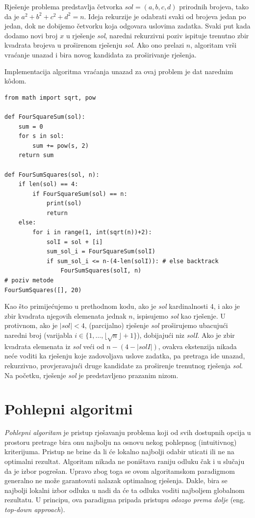 \begin{solution}
	Rješenje problema predstavlja četvorka $sol = (a, b, c, d)$ prirodnih brojeva, tako da je $a^2 + b^2 + c^2 + d^2 = n$. Ideja rekurzije je odabrati svaki  od brojeva jedan po jedan, dok ne dobijemo četvorku koja odgovara uslovima zadatka. Svaki put kada dodamo novi broj $x$ u rješenje \emph{sol}, naredni rekurzivni poziv ispituje trenutno zbir kvadrata brojeva u proširenom rješenju \emph{sol}. Ako ono prelazi $n$, algoritam vrši vraćanje unazad i bira novog kandidata za proširivanje rješenja. 
	
 Implementacija algoritma vraćanja unazad za ovaj problem je dat narednim k\^odom.
 
 \begin{verbatim}
from math import sqrt, pow

def FourSquareSum(sol):
	sum = 0
	for s in sol:
		sum += pow(s, 2)
	return sum

def FourSumSquares(sol, n):
	if len(sol) == 4:
		if FourSquareSum(sol) == n:
			print(sol)
			return 
	else:
		for i in range(1, int(sqrt(n))+2):
			solI = sol + [i]
			sum_sol_i = FourSquareSum(solI)
			if sum_sol_i <= n-(4-len(solI)): # else backtrack  
				FourSumSquares(solI, n) 
# poziv metode
FourSumSquares([], 20)
 \end{verbatim}
	
	Kao što primijećujemo u prethodnom kodu, ako je \emph{sol} kardinalnosti 4, i ako je zbir kvadrata njegovih elemenata jednak $n$, ispisujemo \emph{sol} kao rješenje. U protivnom, ako je $|sol|<4$, (parcijalno) rješenje \emph{sol} proširujemo ubacujući naredni broj (varijabla $i\in \{1, \ldots, \lfloor\sqrt{n} \rfloor + 1 \}$), dobijajući niz \emph{solI}.  Ako je zbir kvadrata elemenata iz \emph{sol} veći od $n-(4 - |solI|)$, ovakva ekstenzija nikada neće voditi ka rješenju koje zadovoljava uslove zadatka, pa pretraga ide unazad, rekurzivno, provjeravajući druge kandidate za proširenje trenutnog rješenja \emph{sol}. Na početku, rješenje \emph{sol} je predstavljeno prazanim nizom.
	 
\end{solution}
 
 
\section{Pohlepni algoritmi}
\textit{Pohlepni algoritam} je pristup rješavanju problema koji od svih dostupnih opcija u prostoru pretrage bira onu najbolju na osnovu nekog pohlepnog (intuitivnog) kriterijuma. Pristup ne brine da li će lokalno najbolji odabir uticati ili ne na optima\-lni rezultat. Algoritam nikada ne poništava raniju odluku čak i u slučaju da je izbor pogrešan. Upravo zbog toga se ovom algoritamskom paradigmom generalno ne može  garantovati nalazak optima\-lnog rješenja. Dakle, bira se najbolji lokalni izbor odluka u nadi da će ta odluka voditi   najboljem globalnom rezultatu. U principu, ova paradigma pripada   pristupu \textit{odozgo prema dolje} (eng. \textit{top-down approach}). \\

